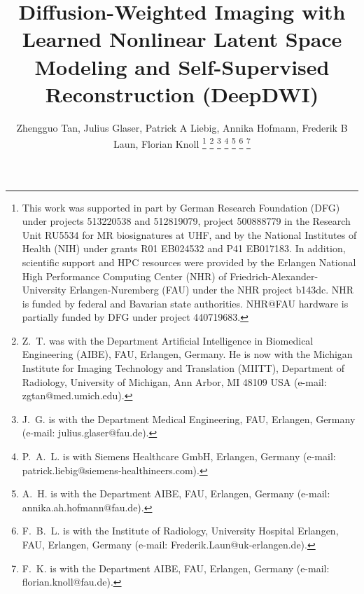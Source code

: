 \documentclass[journal,twoside,web]{ieeecolor}
\begin{document}
	\title{Diffusion-Weighted Imaging with Learned Nonlinear Latent Space Modeling and Self-Supervised Reconstruction (DeepDWI)}

	\author{Zhengguo Tan, Julius Glaser, Patrick A Liebig, Annika Hofmann, Frederik B Laun, Florian Knoll
		\thanks{This work was supported in part by
			German Research Foundation (DFG)
			under projects 513220538 and 512819079,
			project 500888779 in the Research Unit RU5534
			for MR biosignatures at UHF,
			and by the National Institutes of Health (NIH)
			under grants R01 EB024532 and P41 EB017183.
			In addition, scientific support and HPC resources
			were provided by
			the Erlangen National High Performance Computing Center (NHR)
			of Friedrich-Alexander-University Erlangen-Nuremberg (FAU)
			under the NHR project b143dc.
			NHR is funded by federal and Bavarian state authorities.
			NHR@FAU hardware is partially funded by
			DFG under project 440719683.}
		\thanks{Z.~T. was with the Department
			Artificial Intelligence in Biomedical Engineering (AIBE),
			FAU, Erlangen, Germany.
			He is now with
			the Michigan Institute for Imaging Technology and Translation
			(MIITT),
			Department of Radiology,
			University of Michigan, Ann Arbor, MI 48109 USA
			(e-mail: zgtan@med.umich.edu).}
		\thanks{J.~G. is with the Department Medical Engineering,
			FAU, Erlangen, Germany
			(e-mail: julius.glaser@fau.de).}
		\thanks{P.~A.~L. is with Siemens Healthcare GmbH, Erlangen, Germany
			(e-mail: patrick.liebig@siemens-healthineers.com).}
		\thanks{A.~H. is with the Department AIBE,
			FAU, Erlangen, Germany
			(e-mail: annika.ah.hofmann@fau.de).}
		\thanks{F.~B.~L. is with the Institute of Radiology,
			University Hospital Erlangen,
			FAU, Erlangen, Germany
			(e-mail: Frederik.Laun@uk-erlangen.de).}
		\thanks{F.~K. is with the Department AIBE,
			FAU, Erlangen, Germany
			(e-mail: florian.knoll@fau.de).}
	}

	\maketitle
\end{document}
